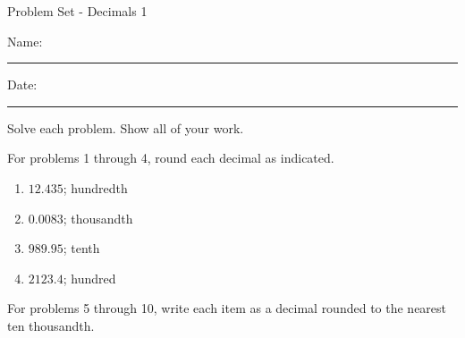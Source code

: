 \documentclass[12pt]{article}
\begin{document}
\pagestyle{empty} %
\begin{center}
          Problem Set - Decimals 1 \\[0.5in]
\end{center}
Name: \rule{4in}{0.005in} Date: \rule{1.5in}{0.005in} 
  \vspace{0.25in}

Solve each problem. Show all of your work. 

For problems 1 through 4, round each decimal as indicated. 
\begin{multicols}{2}
\begin{enumerate}

    \item \hspace{0.250in} $12.435$; hundredth
  \vspace{0.25in}

    \item \hspace{0.250in} $0.0083$; thousandth
  \vspace{0.25in}

    \item \hspace{0.250in} $989.95$; tenth
  \vspace{0.25in}

    \item \hspace{0.250in} $2123.4$; hundred
  \vspace{0.25in}

\end{enumerate}
\end{multicols}
For problems 5 through 10, write each item as a decimal rounded to the nearest ten thousandth.
\end{document}
